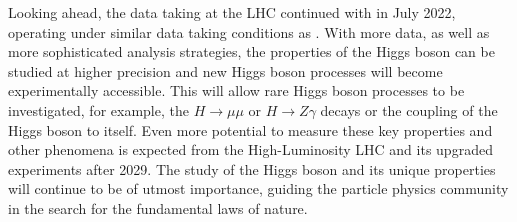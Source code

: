Looking ahead, the data taking at the LHC continued with \RunThr in July 2022, operating under similar data taking conditions as \RunTwo. 
With more data, as well as more sophisticated analysis strategies, the properties of the Higgs boson can be studied at higher precision and new Higgs boson processes will become experimentally accessible. 
This will allow rare Higgs boson processes to be investigated, for example, the $H \to \mu\mu$ or $H \to Z\gamma$ decays or the coupling of the Higgs boson to itself.
Even more potential to measure these key properties and other phenomena is expected from the High-Luminosity LHC and its upgraded experiments after 2029.
The study of the Higgs boson and its unique properties will continue to be of utmost importance, guiding the particle physics community in the search for the fundamental laws of nature. 

